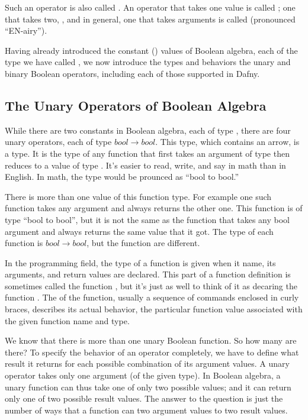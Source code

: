 \documentclass[letterpaper,10pt,english]{sphinxmanual}
\begin{document}
Such an operator is also called . An operator that takes one
value is called ; one that takes two, , and in general,
one that takes  arguments is called  (pronounced “EN-airy”).

Having already introduced the constant () values of Boolean
algebra, each of the type we have called , we now introduce the
types and behaviors the unary and binary Boolean operators, including
each of those supported in Dafny.


\subsection{The Unary Operators of Boolean Algebra}
\label{\detokenize{07-boolean-algebra:the-unary-operators-of-boolean-algebra}}
While there are two constants in Boolean algebra, each of type ,
there are four unary operators, each of type \(bool \rightarrow
bool\). This type, which contains an arrow, is a  type. It is
the type of any function that first takes an argument of type 
then reduces to a value of type . It’s easier to read, write,
and say in math than in English. In math, the type would be prounced
as “bool to bool.”

There is more than one value of this function type. For example one
such function takes any  argument and always returns the other
one. This function is of type “bool to bool”, but it is not the same
as the function that takes any bool argument and always returns the
same value that it got. The type of each function is \(bool
\rightarrow bool\), but the function  are different.

In the programming field, the type of a function is given when it
name, its arguments, and return values are declared. This part of a
function definition is sometimes called the function , but
it’s just as well to think of it as decaring the function .  The
 of the function, usually a sequence of commands enclosed in
curly braces, describes its actual behavior, the particular function
value associated with the given function name and type.

We know that there is more than one unary Boolean function. So how
many are there? To specify the behavior of an operator completely, we
have to define what result it returns for each possible combination of
its argument values. A unary operator takes only one argument (of the
given type). In Boolean algebra, a unary function can thus take one of
only two possible values; and it can return only one of two possible
result values. The answer to the question is just the number of ways
that a function can  two argument values to two result values.
\end{document}

